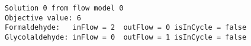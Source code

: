 \begin{verbatim}
Solution 0 from flow model 0
Objective value: 6
Formaldehyde:	inFlow = 2	outFlow = 0	isInCycle = false
Glycolaldehyde:	inFlow = 0	outFlow = 1	isInCycle = false
\end{verbatim}
